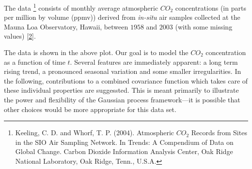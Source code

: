 \documentclass[letterpaper,10pt,english]{sphinxmanual}
\begin{document}
The data \footnote{
Keeling, C. D. and Whorf, T. P. (2004). Atmospheric $CO_2$ Records from Sites in the SIO Air Sampling Network. In Trends: A Compendium of Data on Global Change. Carbon Dioxide Information Analysis Center, Oak Ridge National Laboratory, Oak Ridge, Tenn., U.S.A.
} consists of monthly average atmospheric $CO_2$
concentrations (in parts per million by volume (ppmv)) derived from \emph{in-situ}
air samples collected at the Mauna Loa Observatory, Hawaii, between $1958$ and
$2003$ (with some missing values) \href{http://cdiac.esd.ornl.gov/ftp/trends/co2/maunaloa.co2}{{[}2{]}}.
\begin{figure}[htbp]
\centering

\end{figure}

The data is shown in the above plot. Our goal is to model the $CO_2$
concentration as a function of time $t$. Several features are
immediately apparent: a long term rising trend, a pronounced seasonal variation
and some smaller irregularities. In the following, contributions to a
combined covariance function which takes care of these individual properties are suggessted.
This is meant primarily to illustrate the power and flexibility of the Gaussian
process framework—it is possible that other choices would be more appropriate
for this data set.
\end{document}
